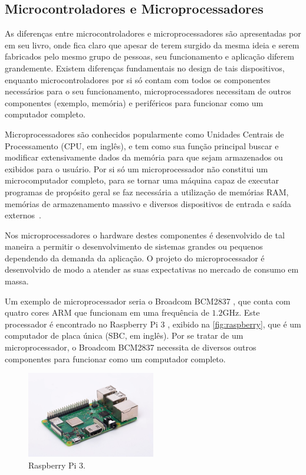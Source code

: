 \subsection{Microcontroladores e Microprocessadores}%

As diferenças entre microcontroladores e microprocessadores são apresentadas por  em seu livro, onde fica claro que apesar de terem surgido da mesma ideia e serem fabricados pelo mesmo grupo de pessoas, seu funcionamento e aplicação diferem grandemente. Existem diferenças fundamentais no design de tais dispositivos, enquanto microcontroladores por si só contam com todos os componentes necessários para o seu funcionamento, microprocessadores necessitam de outros componentes (exemplo, memória) e periféricos para funcionar como um computador completo.

Microprocessadores são conhecidos popularmente como Unidades Centrais de Processamento (CPU, em inglês), e tem como sua função principal buscar e modificar extensivamente dados da memória para que sejam armazenados ou exibidos para o usuário. Por si só um microprocessador não constitui um microcomputador completo, para se tornar uma máquina capaz de executar programas de propósito geral se faz necessária a utilização de memórias RAM, memórias de armazenamento massivo e diversos dispositivos de entrada e saída externos~\cite{ayala:1991}.

Nos microprocessadores o hardware destes componentes é desenvolvido de tal maneira a permitir o desenvolvimento de sistemas grandes ou pequenos dependendo da demanda da aplicação. O projeto do microprocessador é desenvolvido de modo a atender as suas expectativas no mercado de consumo em massa.  

Um exemplo de microprocessador seria o Broadcom BCM2837 \cite{raspberry_bcm}, que conta com quatro cores ARM que funcionam em uma frequência de $1.2$GHz. Este processador é encontrado no Raspberry Pi 3 \cite{raspberry:pi3}, exibido na \autoref{fig:raspberry}, que é um computador de placa única (SBC, em inglês). Por se tratar de um microprocessador, o Broadcom BCM2837 necessita de diversos outros componentes para funcionar como um computador completo.

\begin{figure}[ht]
    \centering
    \includegraphics[width=0.5\textwidth, keepaspectratio]{resources/rasp.jpg}
    \caption{Raspberry Pi 3. \cite{raspberry:pi3}}
    \label{fig:raspberry}
\end{figure}

